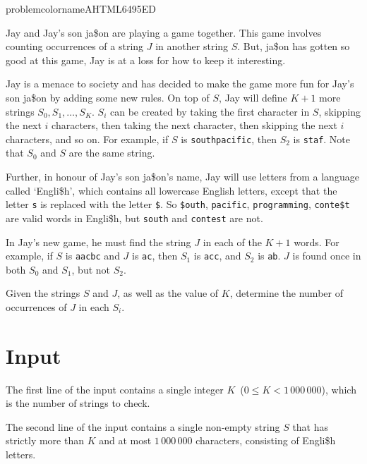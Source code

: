 \renewcommand\problemlabel{A}
\renewcommand\problemcolor{6495ED}
\renewcommand\problemtitle{A Menace 2 \$ociety}
\renewcommand\timelimit{15.0}
\renewcommand\memorylimit{2048}

\renewcommand\problemcolorname{problemcolorname\problemlabel}
\definecolor\problemcolorname{HTML}{\problemcolor}

\pagestyle{problem}

\problemheader

Jay and Jay's son ja\$on are playing a game together. This game involves counting
occurrences of a string $J$ in another string $S$. But, ja\$on has
gotten so good at this game, Jay is at a loss for how to keep it interesting.

Jay is a menace to society and has decided to make the game more fun for Jay's
son ja\$on by adding some new rules. On top of $S$, Jay will define $K + 1$ more strings
$S_0, S_1, \dots, S_K$. $S_i$ can be created by taking the first character in $S$, skipping the next $i$ characters, then taking the next character, then skipping the next $i$ characters, and so on. For example, if $S$ is \texttt{southpacific}, then $S_2$ is \texttt{staf}. Note that $S_0$ and $S$ are the same string.

Further, in honour of Jay's son ja\$on's name, Jay will use letters from a language called `Engli\$h', which contains all lowercase English letters, except that the letter \texttt{s} is replaced with the letter \texttt{\$}. So \texttt{\$outh}, \texttt{pacific}, \texttt{programming}, \texttt{conte\$t} are valid words in Engli\$h, but \texttt{south} and \texttt{contest} are not.

In Jay's new game, he must find the string $J$ in each of the $K+1$ words.
For example, if $S$ is \texttt{aacbc} and $J$ is \texttt{ac}, then $S_1$ is \texttt{acc}, and $S_2$ is \texttt{ab}. $J$ is found once in both $S_0$ and $S_1$, but not $S_2$.

Given the strings $S$ and $J$, as well as the value of $K$, determine the number of occurrences of $J$ in each $S_i$.


\section*{Input}
The first line of the input contains a single integer $K$~($0 \leq K < 1\,000\,000$),
which is the number of strings to check.

The second line of the input contains a single non-empty string $S$ that has strictly more than $K$ and at most $1\,000\,000$ characters, consisting of Engli\$h letters.

